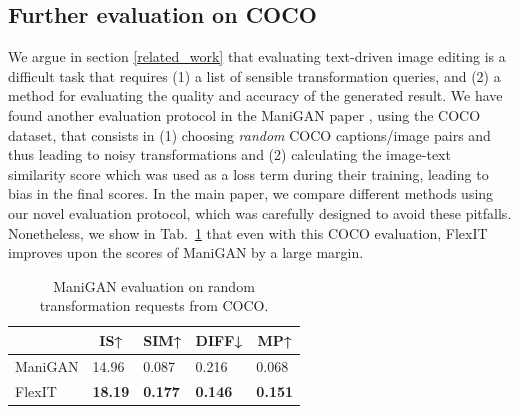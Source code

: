 \subsection{Further evaluation on COCO}

We argue in section \ref{related_work} that evaluating text-driven image editing is a difficult task that requires (1) a list of sensible transformation queries, and (2) a method for evaluating the quality and accuracy of the generated result. We have found another evaluation protocol in the ManiGAN paper \cite{li2020manigan}, using the COCO dataset, that consists in (1) choosing \textit{random} COCO captions/image pairs and thus leading to noisy transformations and (2) calculating the image-text similarity score which was used as a loss term during their training, leading to bias in the final scores. In the main paper, we compare different methods using our novel evaluation protocol, which was carefully designed to avoid these pitfalls. Nonetheless, we show in Tab.\ \ref{results_manigan} that even with this COCO evaluation, FlexIT improves upon the scores of ManiGAN by a large margin.


\begin{table}[H]
\small
\centering
\begin{tabular}{l|l|l|l|l|}
\cline{2-5}
                              & \multicolumn{1}{c|}{IS↑} & \multicolumn{1}{c|}{SIM↑} & \multicolumn{1}{c|}{DIFF↓}             & \multicolumn{1}{c|}{MP↑} \\ \hline
\multicolumn{1}{|l|}{ManiGAN} & 14.96                   & 0.087                    & 0.216                                 & 0.068                   \\ \hline
\multicolumn{1}{|l|}{FlexIT}  & \textbf{18.19}          & \textbf{0.177}           & {\color[HTML]{000000} \textbf{0.146}} & \textbf{0.151}          \\ \hline
\end{tabular}
\caption{ManiGAN evaluation on random transformation requests from COCO.}
\label{results_manigan}
\end{table}


